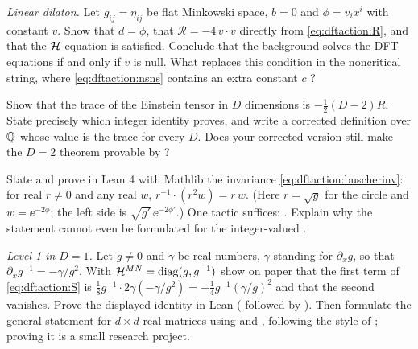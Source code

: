 \begin{exercise}[$\star\star$] \emph{Linear dilaton.}
Let $g_{ij}=\eta_{ij}$ be flat Minkowski space, $b=0$ and $\phi=v_ix^i$ with constant $v$. Show
that $d=\phi$, that $\mathcal R=-4\,v\cdot v$ directly from \eqref{eq:dftaction:R}, and that the
$\mathcal{H}$ equation is satisfied. Conclude that the background solves the DFT equations if and only if
$v$ is null. What replaces this condition in the noncritical string, where
\eqref{eq:dftaction:nsns} contains an extra constant $c$ ?
\end{exercise}

\begin{exercise}[$\star\star$]
Show that the trace of the Einstein tensor in $D$ dimensions is $-\tfrac12(D-2)R$. State
precisely which integer identity  proves, and write a corrected
definition over $\mathbb{Q}$ whose value is the trace for every $D$. Does your corrected version still
make the $D=2$ theorem provable by ?
\end{exercise}

\begin{exercise}\label{ex:dftaction:leaninv}
State and prove in Lean 4 with Mathlib the invariance \eqref{eq:dftaction:buscherinv}:
for real $r\neq0$ and any real $w$, $r^{-1}\cdot(r^2w)=r\,w$. (Here $r=\sqrt g$ for the circle
and $w=\ee^{-2\phi}$; the left side is $\sqrt{g'}\,\ee^{-2\phi'}$.) One tactic suffices:
. Explain why the statement cannot even be formulated for the integer-valued
.
\end{exercise}

\begin{exercise}\label{ex:dftaction:leanjet}
\emph{Level 1 in $D=1$.} Let $g\neq0$ and $\gamma$ be real numbers, $\gamma$ standing for
$\partial_xg$, so that $\partial_xg^{-1}=-\gamma/g^2$. With $\mathcal{H}^{MN}=\operatorname{diag}(g,g^{-1})$ show on
paper that the first term of \eqref{eq:dftaction:S} is
$\tfrac18g^{-1}\cdot2\gamma(-\gamma/g^2)=-\tfrac14g^{-1}(\gamma/g)^2$ and that the second
vanishes. Prove the displayed identity in Lean ( followed by ). Then
formulate the general statement for $d\times d$ real matrices using  and
, following the style of ; proving it is a small research
project.
\end{exercise}

